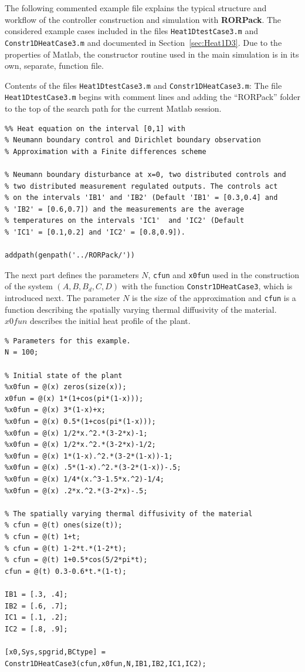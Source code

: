 \documentclass[11pt, a4paper]{amsart}
\theoremstyle{definition}
\numberwithin{equation}{section}
\newcommand{\RORname}{\textbf{RORPack}}
\begin{document}
The following commented example file explains the typical structure and workflow of the controller construction and simulation with \RORname. The considered example cases included in the files \texttt{Heat1DtestCase3.m} and \texttt{Constr1DHeatCase3.m} and documented in Section~\ref{sec:Heat1D3}. Due to the properties of Matlab, the constructor routine used in the main simulation is in its own, separate, function file.

Contents of the files \texttt{Heat1DtestCase3.m} and \texttt{Constr1DHeatCase3.m}: The file \texttt{Heat1DtestCase3.m} begins with comment lines and adding the ``RORPack'' folder to the top of the search path for the current Matlab session.

\begin{lstlisting}
%% Heat equation on the interval [0,1] with 
% Neumann boundary control and Dirichlet boundary observation 
% Approximation with a Finite differences scheme 

% Neumann boundary disturbance at x=0, two distributed controls and
% two distributed measurement regulated outputs. The controls act 
% on the intervals 'IB1' and 'IB2' (Default 'IB1' = [0.3,0.4] and 
% 'IB2' = [0.6,0.7]) and the measurements are the average 
% temperatures on the intervals 'IC1'  and 'IC2' (Default 
% 'IC1' = [0.1,0.2] and 'IC2' = [0.8,0.9]).

addpath(genpath('../RORPack/'))
\end{lstlisting}

The next part defines the parameters $N$, \texttt{cfun} and \texttt{x0fun} used in the construction of the system $(A,B,B_d,C,D)$ with the function \texttt{Constr1DHeatCase3}, which is introduced next. The parameter $N$ is the size of the approximation and \texttt{cfun} is a function describing the spatially varying thermal diffusivity of the material. $x0fun$ describes the initial heat profile of the plant.

\begin{lstlisting}
% Parameters for this example.
N = 100; 

% Initial state of the plant
%x0fun = @(x) zeros(size(x));
x0fun = @(x) 1*(1+cos(pi*(1-x)));
%x0fun = @(x) 3*(1-x)+x;
%x0fun = @(x) 0.5*(1+cos(pi*(1-x)));
%x0fun = @(x) 1/2*x.^2.*(3-2*x)-1;
%x0fun = @(x) 1/2*x.^2.*(3-2*x)-1/2;
%x0fun = @(x) 1*(1-x).^2.*(3-2*(1-x))-1;
%x0fun = @(x) .5*(1-x).^2.*(3-2*(1-x))-.5;
%x0fun = @(x) 1/4*(x.^3-1.5*x.^2)-1/4;
%x0fun = @(x) .2*x.^2.*(3-2*x)-.5;

% The spatially varying thermal diffusivity of the material
% cfun = @(t) ones(size(t));
% cfun = @(t) 1+t;
% cfun = @(t) 1-2*t.*(1-2*t);
% cfun = @(t) 1+0.5*cos(5/2*pi*t);
cfun = @(t) 0.3-0.6*t.*(1-t);

IB1 = [.3, .4];
IB2 = [.6, .7];
IC1 = [.1, .2];
IC2 = [.8, .9];

[x0,Sys,spgrid,BCtype] = Constr1DHeatCase3(cfun,x0fun,N,IB1,IB2,IC1,IC2);
 \end{lstlisting}
\end{document}

